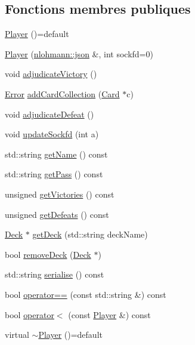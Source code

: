 \subsection*{Fonctions membres publiques}
\begin{DoxyCompactItemize}
\item 
\hyperlink{classPlayer_aaa23b3bf80e8c0267cf08d4fe4d6ddc1}{Player} ()=default
\item 
\hyperlink{classPlayer_a9e88d178553a82a6c7406b8ff78e1beb}{Player} (\hyperlink{CardManager_8hpp_ab701e3ac61a85b337ec5c1abaad6742d}{nlohmann\+::json} \&, int sockfd=0)
\item 
void \hyperlink{classPlayer_a224828ffebbc85cda6a370eb7fab7332}{adjudicate\+Victory} ()
\item 
\hyperlink{Error_8hpp_a2c3e4bb40f36b262a5214e2da2bca9c5}{Error} \hyperlink{classPlayer_ad6b7d88cbcd56aeb046c154fdedeb52e}{add\+Card\+Collection} (\hyperlink{classCard}{Card} $\ast$c)
\item 
void \hyperlink{classPlayer_a882d9db35e3277bcd2db52fa9eca7dfb}{adjudicate\+Defeat} ()
\item 
void \hyperlink{classPlayer_adf7cea3607c835e1c32f054524cd3027}{update\+Sockfd} (int a)
\item 
std\+::string \hyperlink{classPlayer_ad4c6a95f1cf69c44d0c585465b101c70}{get\+Name} () const 
\item 
std\+::string \hyperlink{classPlayer_a244625f85468369c2dd4115d10dd96c0}{get\+Pass} () const 
\item 
unsigned \hyperlink{classPlayer_a6cce4ff00f12069ee17a0c8d8be7912a}{get\+Victories} () const 
\item 
unsigned \hyperlink{classPlayer_ac8d227b243a10660a092e289365d4f13}{get\+Defeats} () const 
\item 
\hyperlink{classDeck}{Deck} $\ast$ \hyperlink{classPlayer_a24e81b3a057a93babe3ff469d59cecd3}{get\+Deck} (std\+::string deck\+Name)
\item 
bool \hyperlink{classPlayer_af7f21437111ed192905e76777e1cfcff}{remove\+Deck} (\hyperlink{classDeck}{Deck} $\ast$)
\item 
std\+::string \hyperlink{classPlayer_a03a285ddda49ed0c0383b39a0a5f415b}{serialise} () const 
\item 
bool \hyperlink{classPlayer_ad595a59902a36610d2aa8d496a071f1f}{operator==} (const std\+::string \&) const 
\item 
bool \hyperlink{classPlayer_ab8344f240fbc64e17012fea952bf5821}{operator$<$} (const \hyperlink{classPlayer}{Player} \&) const 
\item 
virtual \hyperlink{classPlayer_a11017c0ed8a639f3b1308ab167fbeca2}{$\sim$\+Player} ()=default
\end{DoxyCompactItemize}
